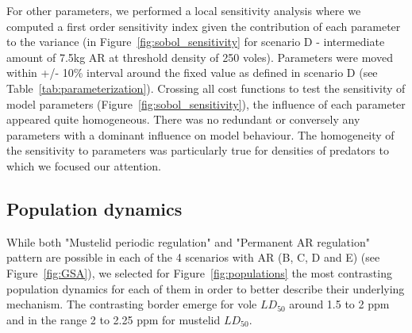 \documentclass[11pt]{article}
\begin{document}
For other parameters, we performed a local sensitivity analysis where we computed a first order sensitivity index \citep{Sobol1993, Saltelli2019} given the contribution of each parameter to the variance (in Figure~\ref{fig:sobol_sensitivity} for scenario D - intermediate amount of 7.5kg AR at threshold density of 250 voles).
%
Parameters were moved within +/- 10\% interval around the fixed value as defined in scenario D (see Table~\ref{tab:parameterization}).
%
Crossing all cost functions to test the sensitivity of model parameters (Figure~\ref{fig:sobol_sensitivity}), the influence of each parameter appeared quite homogeneous.
%
There was no redundant or conversely any parameters with a dominant influence on model behaviour.
%
The homogeneity of the sensitivity to parameters was particularly true for densities of predators to which we focused our attention.  

%
%

\subsection{Population dynamics}

While both "Mustelid periodic regulation" and "Permanent AR regulation" pattern  are possible in each of the 4 scenarios with AR (B, C, D and E) (see Figure~\ref{fig:GSA}), we selected for Figure~\ref{fig:populations} the most contrasting population dynamics for each of them in order to better describe their underlying mechanism. The contrasting border emerge for vole $LD_{50}$ around 1.5 to 2 ppm and in the range 2 to 2.25 ppm for mustelid $LD_{50}$.
\end{document}
